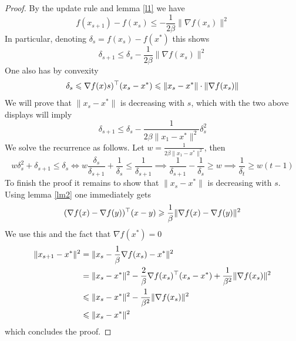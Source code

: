 \begin{proof}
By the update rule and lemma \ref{l1} we have
$$f(x_{s+1}) - f(x_s) \leq -\frac{1}{2\beta}\|\nabla f(x_s)\|^2 $$
In particular, denoting $\delta_s = f(x_s) - f(x^*)$ this shows
$$\delta_{s+1} \leq \delta_s - \frac{1}{2\beta}\|\nabla f(x_s)\|^2 $$
One also has by convexity
$$\delta_s \leqslant \nabla f(x)s)^\top(x_s - x^*) \leqslant \|x_s - x^*\| \cdot \|\nabla f(x_s)\|$$
We will prove that $\|x_s - x^*\|$ is decreasing with $s$, which with the two above displays will imply
$$\delta_{s+1}\leq \delta_s - \frac{1}{2\beta\|x_1 - x^*\|^2}\delta_s^2$$
We solve the recurrence as follows.  Let $w = \frac{1}{2\beta\|x_1 - x^*\|^2}$, then
$$w\delta_s^2 + \delta_{s+1} \leq \delta_s \iff w\frac{\delta_s}{\delta_{s+1}} + \frac
{1}{\delta_s} \leq \frac{1}{\delta_{s+1}} \implies \frac{1}{\delta_{s+1}} - \frac{1}{\delta_s} \geq w \implies \frac{1}{\delta_t} \geq w(t-1)$$
To finish the proof it remains to show that $\|x_s - x^*\|$ is decreasing with $s$.  Using lemma \ref{lm2} one immediately gets
$$ (\nabla f(x) - \nabla f(y))^\top(x - y) \geqslant \frac{1}{\beta} \|\nabla f(x) - \nabla f(y)\|^2$$
We use this and the fact that $\nabla f(x^*) = 0$
\begin{align}
    \|x_{s+1} - x^*\|^2 &= \|x_s - \frac{1}{\beta}\nabla f(x_s) - x^*\|^2 \\
    &= \|x_s - x^*\|^2 - \frac{2}{\beta}\nabla f(x_s)^\top(x_s - x^*) + \frac{1}{\beta^2}\|\nabla f(x_s)\|^2 \\
    &\leqslant \|x_s - x^*\|^2 - \frac{1}{\beta^2} \|\nabla f(x_s)\|^2 \\
    &\leqslant \|x_s - x^*\|^2
\end{align}
which concludes the proof.
\end{proof}

